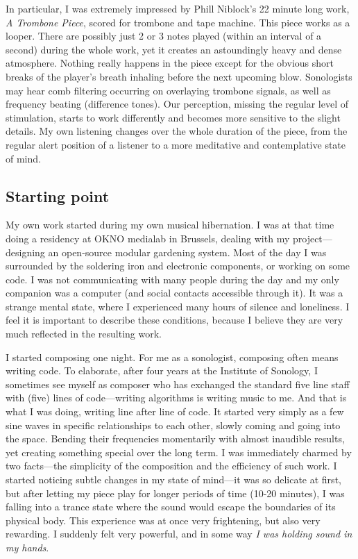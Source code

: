 \documentclass[12pt,a4paper,oneside]{report}
\begin{document}
In particular, I was extremely impressed by Phill Niblock's 22 minute long work, \emph{A Trombone Piece}, scored for trombone and tape machine. This piece works as a looper. There are possibly just 2 or 3 notes played (within an interval of a second) during the whole work, yet it creates an astoundingly heavy and dense atmosphere. Nothing really happens in the piece except for the obvious short breaks of the player's breath inhaling before the next upcoming blow. Sonologists may hear comb filtering occurring on overlaying trombone signals, as well as frequency beating (difference tones). Our perception, missing the regular level of stimulation, starts to work differently and becomes more sensitive to the slight details. My own listening changes over the whole duration of the piece, from the regular alert position of a listener to a more meditative and contemplative state of mind. 

\subsection{Starting point}

My own work started during my own musical hibernation. I was at that time doing a residency at OKNO medialab in Brussels, dealing with my project---designing an open-source modular gardening system. Most of the day I was surrounded by the soldering iron and electronic components, or working on some code. I was not communicating with many people during the day and my only companion was a computer (and social contacts accessible through it). It was a strange mental state, where I experienced many hours of silence and loneliness. I feel it is important to describe these conditions, because I believe they are very much reflected in the resulting work. 

I started composing one night. For me as a sonologist, composing often means writing code. To elaborate, after four years at the Institute of Sonology, I sometimes see myself as composer who has exchanged the standard five line staff with (five) lines of code---writing algorithms is writing music to me. And that is what I was doing, writing line after line of code. It started very simply as a few sine waves in specific relationships to each other, slowly coming and going into the space. Bending their frequencies momentarily with almost inaudible results, yet creating something special over the long term. I was immediately charmed by two facts---the simplicity of the composition and the efficiency of such work. I started noticing subtle changes in my state of mind---it was so delicate at first, but after letting my piece play for longer periods of time (10-20 minutes), I was falling into a trance state where the sound would escape the boundaries of its physical body. This experience was at once very frightening, but also very rewarding. I suddenly felt very powerful, and in some way \emph{I was holding sound in my hands}. 
\end{document}
